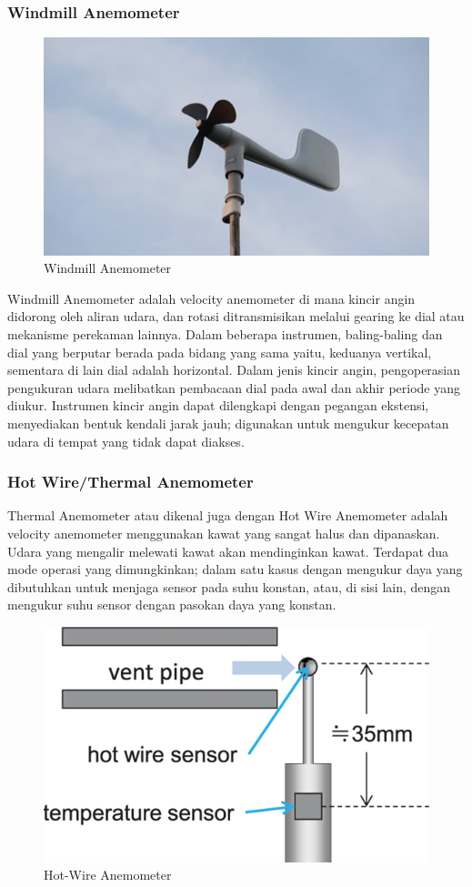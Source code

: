 \subsubsection{Windmill Anemometer}

\begin{figure}[h!]
	\centering
	\includegraphics[width=0.3\linewidth]{gambar/anemometerWindmill}
	\caption{Windmill Anemometer}
	\label{fig:anemometerwindmill}
\end{figure}


Windmill Anemometer adalah velocity anemometer di mana kincir angin didorong oleh aliran udara, dan rotasi ditransmisikan melalui gearing ke dial atau 
mekanisme perekaman lainnya. Dalam beberapa instrumen, baling-baling dan dial yang berputar berada pada bidang yang sama yaitu, keduanya vertikal, 
sementara di lain dial adalah horizontal. Dalam jenis kincir angin, pengoperasian pengukuran udara melibatkan pembacaan dial pada awal dan akhir 
periode yang diukur. Instrumen kincir angin dapat dilengkapi dengan pegangan ekstensi, menyediakan bentuk kendali jarak jauh; digunakan untuk mengukur 
kecepatan udara di tempat yang tidak dapat diakses.

\subsubsection{Hot Wire/Thermal Anemometer}

Thermal Anemometer atau dikenal juga dengan Hot Wire Anemometer adalah velocity anemometer menggunakan kawat yang sangat halus dan dipanaskan. Udara yang mengalir
melewati kawat akan mendinginkan kawat. Terdapat dua mode operasi yang dimungkinkan; dalam satu kasus dengan
mengukur daya yang dibutuhkan untuk menjaga sensor pada suhu konstan, atau, di sisi
lain, dengan mengukur suhu sensor dengan pasokan daya yang konstan.

\begin{figure}[h!]
	\centering
	\includegraphics[width=0.4\linewidth]{gambar/anemometerHotWire}
	\caption{Hot-Wire Anemometer}
	\label{fig:anemometerhotwire}
\end{figure}


